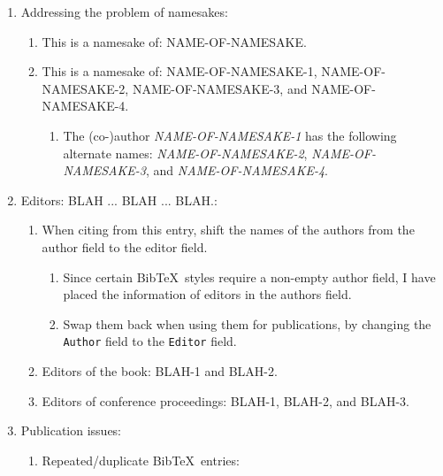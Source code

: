 \documentclass[letter,12pt]{article}
\begin{document}
\begin{enumerate}
\begin{enumerate}
	\end{enumerate}
\item Addressing the problem of namesakes: \vspace{-0.3cm}
	\begin{enumerate} \itemsep -2pt
	\item This is a namesake of: NAME-OF-NAMESAKE.
	\item This is a namesake of: NAME-OF-NAMESAKE-1, NAME-OF-NAMESAKE-2, NAME-OF-NAMESAKE-3, and NAME-OF-NAMESAKE-4. \vspace{-0.2cm}
		\begin{enumerate} \itemsep -2pt
		\item The (co-)author {\it NAME-OF-NAMESAKE-1} has the following alternate names: {\it NAME-OF-NAMESAKE-2}, {\it NAME-OF-NAMESAKE-3}, and {\it NAME-OF-NAMESAKE-4}.
		\end{enumerate}
	\end{enumerate}
\item Editors: BLAH ... BLAH ... BLAH.: \vspace{-0.3cm}
	\begin{enumerate} \itemsep -2pt
	\item When citing from this entry, shift the names of the authors from the author field to the editor field. \vspace{-0.2cm}
		\begin{enumerate} \itemsep -2pt
		\item Since certain {\sc Bib}\TeX\ styles require a non-empty author field, I have placed the information of editors in the authors field. 
		\item Swap them back when using them for publications, by changing the {\tt Author} field to the {\tt Editor} field.
		\end{enumerate}
	\item Editors of the book: BLAH-1 and BLAH-2.
	\item Editors of conference proceedings: BLAH-1, BLAH-2, and BLAH-3.
	\end{enumerate}
\item Publication issues: \vspace{-0.3cm}
	\begin{enumerate} \itemsep -2pt
	\item Repeated/duplicate {\sc Bib}\TeX\ entries: \vspace{-0.2cm}

\end{enumerate}
\end{enumerate}
\end{document}
